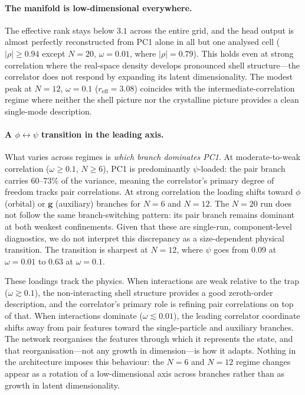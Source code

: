 \paragraph{The manifold is low-dimensional everywhere.}
The effective rank stays below $3.1$ across the entire grid,
and the head output is almost perfectly reconstructed from PC1 alone in all but
one analysed cell ($|\rho|\geq0.94$ except $N{=}20$, $\omega{=}0.01$, where
$|\rho|=0.79$).
This holds even at strong correlation where the real-space density develops pronounced shell
structure---the correlator does not respond by expanding its latent dimensionality.
The modest peak at $N{=}12$, $\omega{=}0.1$ ($r_{\mathrm{eff}} = 3.08$) coincides with the
intermediate-correlation regime where neither the shell picture nor the crystalline picture provides
a clean single-mode description.

\paragraph{A $\phi\leftrightarrow\psi$ transition in the leading axis.}
What varies across regimes is \emph{which branch dominates PC1}.
At moderate-to-weak correlation ($\omega \geq 0.1$, $N\geq 6$),
PC1 is predominantly $\psi$-loaded: the pair branch carries 60--73\% of the variance,
meaning the correlator's primary degree of freedom tracks pair correlations.
At strong correlation the loading shifts toward $\phi$ (orbital) or $\mathbf{g}$
(auxiliary) branches for $N{=}6$ and $N{=}12$. The $N{=}20$ run does not follow
the same branch-switching pattern: its pair branch remains dominant at both weakest
confinements. Given that these are single-run, component-level diagnostics, we do
not interpret this discrepancy as a size-dependent physical transition.
The transition is sharpest at $N{=}12$, where $\psi$ goes from 0.09 at $\omega{=}0.01$
to 0.63 at $\omega{=}0.1$.

These loadings track the physics.
When interactions are weak relative to the trap ($\omega \gtrsim 0.1$),
the non-interacting shell structure provides a good zeroth-order description,
and the correlator's primary role is refining pair correlations on top of that.
When interactions dominate ($\omega \lesssim 0.01$),
the leading correlator coordinate shifts away from pair features toward the
single-particle and auxiliary branches. The network reorganises the features through
which it represents the state, and that reorganisation---not any growth in
dimension---is how it adapts.
Nothing in the architecture imposes this behaviour: the $N{=}6$ and $N{=}12$
regime changes appear as a rotation of a low-dimensional axis across branches rather
than as growth in latent dimensionality.

